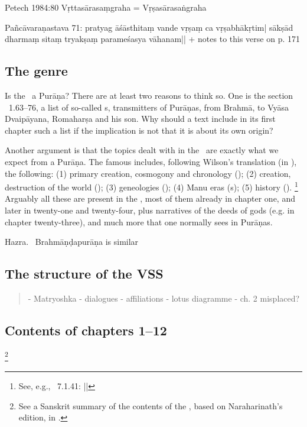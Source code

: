 \documentclass[11pt]{book}
\begin{document}
Petech 1984:80 Vṛttasārasaṃgraha = Vṛṣasārasaṅgraha


Pañcāvaraṇastava 71:
pratyag āśāsthitaṃ vande vṛṣaṃ ca vṛṣabhākṛtim|
sākṣād dharmaṃ sitaṃ tryakṣaṃ parameśasya vāhanam||
+ notes to this verse on p. 171


\subsection{The genre}

Is the \VSS\ a Purāṇa? There are at least two reasons to think so.
One is the section \VSS\ 1.63--76, a list of so-called s, 
transmitters of Purāṇas, from Brahmā, to Vyāsa Dvaipāyana, Romaharṣa and 
his son. Why should a text include in its first chapter such a list if the implication
is not that it is about its own origin?

Another argument is that the topics dealt with in the \VSS\ are exactly what
we expect from a Purāṇa. The famous  includes,
following Wilson's translation (in ), the following:
(1) primary creation, cosmogony and chronology (); 
(2) creation, destruction of the world ();
(3) geneologies (); 
(4) Manu eras (s);
(5) history ().%
		\footnote{See, e.g., \SIVP\ 7.1.41: 
				 ||}
Arguably all these are present in the \VSS, most of them already in chapter one, and later in twenty-one and
twenty-four, plus narratives of the deeds of gods (e.g. in chapter twenty-three), and much more
that one normally sees in Purāṇas.

Hazra. \verify\ Brahmāṇḍapurāṇa is similar \verify



\subsection{The structure of the VSS}

\begin{quote}
- Matryoshka 
- dialogues
- affiliations
- lotus diagramme
- ch. 2 misplaced? 
\end{quote}

\vfill
\pagebreak


\subsection{Contents of chapters 1--12}%
	\footnote{See a Sanskrit summary of the contents of the \VSS,
				     based on Naraharinath's edition,
					in \verify. }
\end{document}

